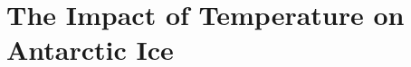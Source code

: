 \documentclass[../main.tex]{subfiles}
\begin{document}
\chapter{The Impact of Temperature on Antarctic Ice}
\section{}
\end{document}
